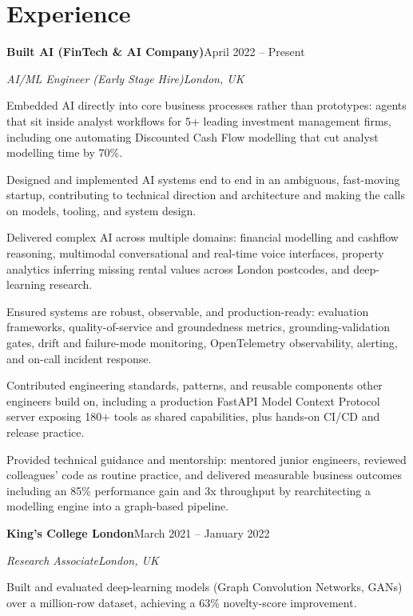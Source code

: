 \documentclass[10pt,a4paper]{article}
\newcommand{\entry}[4]{%
  {\color{company}\bfseries #1}\hfill {\color{muted}#2}\par
  \vspace{1pt}
  {\itshape #3}\hfill {\color{muted}\itshape #4}\par
  \vspace{3pt}%
}
\begin{document}
\section{Experience}
\entry{Built AI (FinTech \& AI Company)}{April 2022 -- Present}{AI/ML Engineer (Early Stage Hire)}{London, UK}
\begin{tight}
  \item Embedded AI directly into core business processes rather than prototypes: agents that sit inside analyst workflows for 5+ leading investment management firms, including one automating Discounted Cash Flow modelling that cut analyst modelling time by 70\%.
  \item Designed and implemented AI systems end to end in an ambiguous, fast-moving startup, contributing to technical direction and architecture and making the calls on models, tooling, and system design.
  \item Delivered complex AI across multiple domains: financial modelling and cashflow reasoning, multimodal conversational and real-time voice interfaces, property analytics inferring missing rental values across London postcodes, and deep-learning research.
  \item Ensured systems are robust, observable, and production-ready: evaluation frameworks, quality-of-service and groundedness metrics, grounding-validation gates, drift and failure-mode monitoring, OpenTelemetry observability, alerting, and on-call incident response.
  \item Contributed engineering standards, patterns, and reusable components other engineers build on, including a production FastAPI Model Context Protocol server exposing 180+ tools as shared capabilities, plus hands-on CI/CD and release practice.
  \item Provided technical guidance and mentorship: mentored junior engineers, reviewed colleagues' code as routine practice, and delivered measurable business outcomes including an 85\% performance gain and 3x throughput by rearchitecting a modelling engine into a graph-based pipeline.
\end{tight}

\entry{King's College London}{March 2021 -- January 2022}{Research Associate}{London, UK}
\begin{tight}
  \item Built and evaluated deep-learning models (Graph Convolution Networks, GANs) over a million-row dataset, achieving a 63\% novelty-score improvement.
\end{tight}
\end{document}
